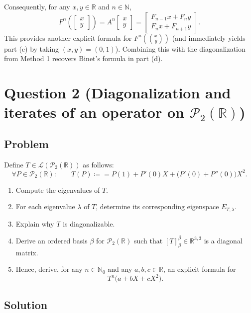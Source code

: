 \documentclass[12pt]{article}
\newcommand{\R}{\mathbb{R}}
\newcommand{\cL}{\mathcal{L}}
\newcommand{\cP}{\mathcal{P}}
\newcommand{\df}{\coloneqq}
\begin{document}
Consequently, for any $x,y\in\R$ and $n\in\mathbb{N}$,
\[
F^n\!\left(\begin{bmatrix}x\\y\end{bmatrix}\right)
=
A^n\begin{bmatrix}x\\y\end{bmatrix}
=
\begin{bmatrix}
F_{n-1}x+F_n y\\
F_n x+F_{n+1}y
\end{bmatrix}.
\]
This provides another explicit formula for $F^n(\binom{x}{y})$ (and immediately yields part (c) by taking $(x,y)=(0,1)$).
Combining this with the diagonalization from Method 1 recovers Binet's formula in part (d).

\newpage
\section{Question 2 (Diagonalization and iterates of an operator on $\cP_2(\R)$)}
\subsection{Problem}
Define $T\in\cL(\cP_2(\R))$ as follows:
\[
\forall P\in\cP_2(\R):\qquad
T(P)\df = P(1) + P'(0)X + \bigl(P'(0)+P''(0)\bigr)X^2.
\]
\begin{enumerate}[label=(\alph*)]
\item Compute the eigenvalues of $T$.
\item For each eigenvalue $\lambda$ of $T$, determine its corresponding eigenspace $E_{T,\lambda}$.
\item Explain why $T$ is diagonalizable.
\item Derive an ordered basis $\beta$ for $\cP_2(\R)$ such that $[T]^{\beta}_{\beta}\in\R^{3,3}$ is a diagonal matrix.
\item Hence, derive, for any $n\in\mathbb{N}_0$ and any $a,b,c\in\R$, an explicit formula for
\[
T^n\!\bigl(a+bX+cX^2\bigr).
\]
\end{enumerate}

\subsection{Solution}
\end{document}
